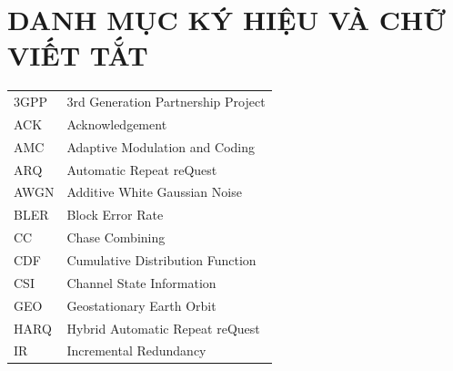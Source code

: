 \section*{DANH MỤC KÝ HIỆU VÀ CHỮ VIẾT TẮT}

\begin{tabular}{l l}
\hspace{1cm} 3GPP     & \hspace{1cm} 3rd Generation Partnership Project \\
\hspace{1cm} ACK      & \hspace{1cm} Acknowledgement \\
\hspace{1cm} AMC      & \hspace{1cm} Adaptive Modulation and Coding \\
\hspace{1cm} ARQ      & \hspace{1cm} Automatic Repeat reQuest \\
\hspace{1cm} AWGN     & \hspace{1cm} Additive White Gaussian Noise \\
\hspace{1cm} BLER     & \hspace{1cm} Block Error Rate \\
\hspace{1cm} CC       & \hspace{1cm} Chase Combining \\
\hspace{1cm} CDF      & \hspace{1cm} Cumulative Distribution Function \\
\hspace{1cm} CSI      & \hspace{1cm} Channel State Information \\
\hspace{1cm} GEO      & \hspace{1cm} Geostationary Earth Orbit \\
\hspace{1cm} HARQ     & \hspace{1cm} Hybrid Automatic Repeat reQuest \\
\hspace{1cm} IR       & \hspace{1cm} Incremental Redundancy \\

\end{tabular}
